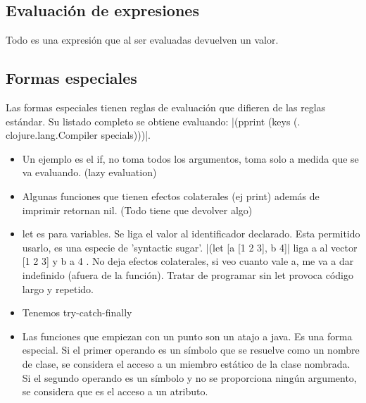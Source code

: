 \subsection*{Evaluación de expresiones}
Todo es una expresión que al ser evaluadas devuelven un valor.


\subsection*{Formas especiales}
Las formas especiales tienen reglas de evaluación que difieren de las reglas estándar. Su listado  completo se obtiene evaluando: |(pprint (keys (. clojure.lang.Compiler specials)))|.

\begin{itemize}
\item Un ejemplo es el if, no toma todos los argumentos, toma solo a medida que se va evaluando. (lazy evaluation)
\item Algunas funciones que tienen efectos colaterales (ej print) además de imprimir retornan nil. (Todo tiene que devolver algo)
\item let es para variables. Se liga el valor al identificador declarado. Esta permitido usarlo, es una especie de 'syntactic sugar'. |(let [a [1 2 3], b 4]| liga a al vector [1 2 3] y b a 4 . No deja efectos colaterales, si veo cuanto vale a, me va a dar indefinido (afuera de la función). Tratar de programar sin let provoca código largo y repetido.
\item Tenemos try-catch-finally
\item Las funciones que empiezan con un punto son un atajo a java. Es una forma especial. Si el primer operando es un  símbolo que se resuelve como un nombre de clase, se considera el acceso a un miembro estático de  la clase nombrada. Si el segundo operando es un símbolo y no se proporciona ningún argumento, se  considera que es el acceso a un atributo.
\end{itemize}




